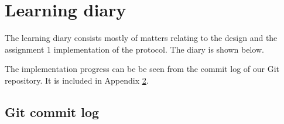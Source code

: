 \documentclass[a4paper]{article}
\begin{document}

\section{Learning diary}
The learning diary consists mostly of matters relating to the design and the
assignment 1 implementation of the protocol. The diary is shown below.



The implementation progress can be be seen from the commit log of our Git
repository. It is included in Appendix \ref{lst:commit_log}.

\clearpage
\begin{appendices}
  \section{Git commit log}\label{lst:commit_log}
  
\end{appendices}
\end{document}
